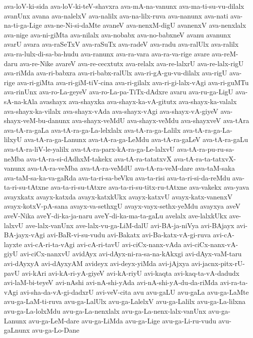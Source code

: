 {ava-loV-ki-sida
ava-loV-ki-teV-shavxra
ava-mA-na-vanunx
ava-ma-ti-su-vu-dilalx
avanUnx
avana
ava-nalelxV
ava-nalilx
ava-na-lilx-ruva
ava-nanunx
ava-nati
ava-na-ti-ga-Lige
ava-ne-Ni-si-daMte
avaneV
ava-nenxM-digU
avanenxV
ava-nenxlalx
ava-nige
ava-ni-giMta
ava-nilalx
ava-nobabx
ava-no-babxneV
avanu
avanunx
avarU
avara
ava-raSeTxV
ava-raSuTx
ava-radeV
ava-radu
ava-ralUlx
ava-ralilx
ava-ra-lulx-di-sa-ba-hudu
ava-ranunx
ava-ra-vara
ava-ra-va-rige
avare
ava-reM-daru
ava-re-Nike
avareV
ava-re-cecxtutx
ava-relalx
ava-re-lalxrU
ava-re-lalx-rigU
ava-riMda
ava-ri-babxra
ava-ri-babx-ralUlx
ava-ri-gA-gu-vu-dilalx
ava-rigU
ava-rige
ava-ri-giMta
ava-ri-giM-tiV-cina
ava-ri-gilalx
ava-ri-gi-lalx-vAgi
ava-ri-guMTu
ava-rinUnx
ava-ro-La-geyeV
ava-ro-La-pa-TiTx-dAdxre
avaru
ava-ru-ga-LigU
ava-sA-na-kAla
avashayx
ava-shayxka
ava-shayx-ka-vA-gitutx
ava-shayx-ka-valalx
ava-shayx-ka-vilalx
ava-shayx-vAda
ava-shayx-vAgi
ava-shayx-vA-giyeV
ava-shayx-veM-bu-danunx
ava-shayx-veMdU
ava-shayx-veMdu
ava-shayxveV
ava-tAra
ava-tA-ra-gaLa
ava-tA-ra-ga-La-lelxlalx
ava-tA-ra-ga-Lalilx
ava-tA-ra-ga-La-lilxyU
ava-tA-ra-ga-Lanunx
ava-tA-ra-ga-LeMdu
ava-tA-ra-gaLeV
ava-tA-ra-gaLu
ava-tA-ra-liV-le-yalilx
ava-tA-ra-parx-kA-ra-ga-Le-lalxvU
ava-tA-ra-pu-ru-sa-neMba
ava-tA-ra-si-dAdhxM-takekx
ava-tA-ra-tatatxvX
ava-tA-ra-ta-tatxvX-vanunx
ava-tA-ra-veMba
ava-tA-ra-veMdU
ava-tA-ra-veM-dare
ava-taM-saka
ava-taM-sa-ka-va-gaRda
ava-ta-ri-sa-beVku
ava-ta-risi
ava-ta-ri-si-da-reMdu
ava-ta-ri-su-tAtxne
ava-ta-ri-su-tAtxre
ava-ta-ri-su-titx-ru-tAtxne
ava-vakekx
ava-yava
avayxkatx
avayx-katxda
avayx-katxkUkx
avayx-katxvU
avayx-katx-vanenxV
avayx-kotxV-pA-sana
avayx-va-sethxgU
avayx-vayx-sethx-yeMdu
avayxya
aveV
aveV-Nika
aveY-di-ka-ja-naru
aveY-di-ka-ma-ta-gaLu
avelalx
ave-lalxkUkx
ave-lalxvU
ave-lalx-vanUnx
ave-lalx-vu-ga-LiM-dalU
avi-BA-ja-niVya
avi-BAjayx
avi-BA-jayx-vAgi
avi-BaR-vi-su-vudu
avi-Bakatx
avi-Ba-katx-vA-gi-ruva
avi-cA-layxte
avi-cA-ri-ta-vAgi
avi-cA-ri-tavU
avi-ciCx-nanx-vAda
avi-ciCx-nanx-vA-giyU
avi-ciCx-nanxvU
avidAyx
avi-dAyx-ni-ra-sa-na-kAkxgi
avi-dAyx-vaM-taru
avi-dAyxyA
avi-dAyxyAM
avideyx
avi-deyx-yiMda
avi-jAjxya
avi-jacnx-pitx-rU-pavU
avi-kAri
avi-kA-ri-yA-giyeV
avi-kA-riyU
avi-kaqta
avi-kaq-ta-vA-dadudx
avi-laM-bi-teyeV
avi-nAshi
avi-nA-shi-yAda
avi-nA-shi-yA-du-da-riMda
avi-ra-ta-vAgi
avi-sha-da-vA-gi-dadxrU
avi-veV-cita
avu
avu-gaLU
avu-gaLa
avu-ga-LaMte
avu-ga-LaM-ti-ruva
avu-ga-LalUlx
avu-ga-LalelxV
avu-ga-Lalilx
avu-ga-La-lilxna
avu-ga-La-lolxMdu
avu-ga-La-nenxlalx
avu-ga-La-nenx-lalx-vanUnx
avu-ga-Lanunx
avu-ga-LeM-dare
avu-ga-LiMda
avu-ga-Lige
avu-ga-Li-ru-vudu
avu-gaLnunx
avu-ga-Lo-Dane
}
